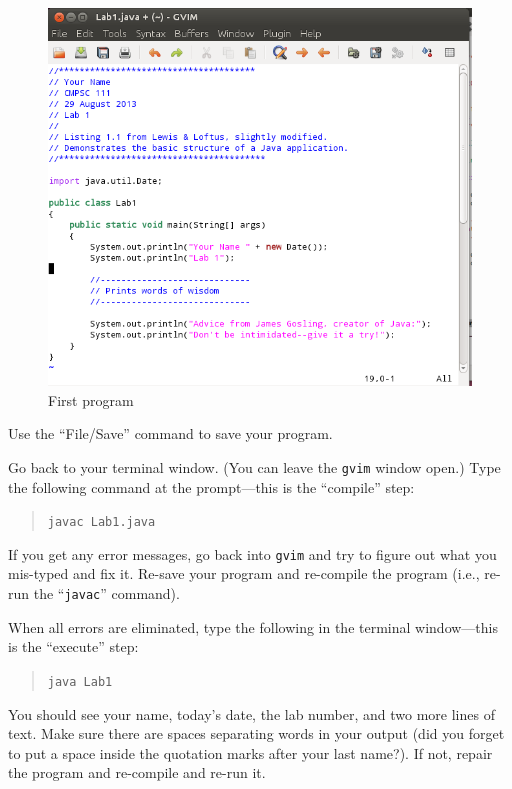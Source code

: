        \begin{figure}[htbp]
         \centering
         \includegraphics[width=5.8in]{images/lab1prog}
         \caption{First program}
         \label{lab1prog}
       \end{figure}

       Use the ``File/Save'' command to save your program.

       Go back to your terminal window. (You can leave the {\tt gvim} window open.)
       Type the following command at the
       prompt---this is the ``compile'' step:
       \begin{quote}
         \verb$javac Lab1.java$
       \end{quote}
       If you get any error messages, go back into {\tt gvim} and try to figure 
       out what you mis-typed and fix it. Re-save your program  and 
       re-compile the program (i.e., re-run the ``{\tt javac}'' command).

       When all errors are eliminated, type the following in the terminal
       window---this is the ``execute'' step:
       \begin{quote}
         \verb$java Lab1$
       \end{quote}
       You should see your name, today's date, the lab number, and two more
       lines of text. Make sure there are spaces separating words in your output
       (did you forget to put a space inside the quotation marks after your
         last name?). If not, repair the program and re-compile and re-run it.

